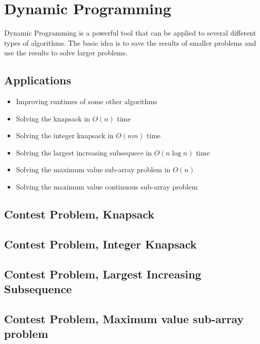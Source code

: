 \section{Dynamic Programming}
Dynamic Programming is a powerful tool that can be applied to several different types of algorithms.
The basic idea is to save the results of smaller problems and use the results to solve larger problems.

\subsection{Applications}
\begin{itemize}
	\item	Improving runtimes of some other algorithms
	\item	Solving the knapsack in $O(n)$ time
	\item	Solving the integer knapsack in $O(nm)$ time
	\item	Solving the largest increasing subsequece in $O(n \log n)$ time
	\item	Solving the maximum value sub-array problem in $O(n)$
	\item	Solving the maximum value continuous sub-array problem
\end{itemize}

\subsection{Contest Problem, Knapsack}
\subsection{Contest Problem, Integer Knapsack}
\subsection{Contest Problem, Largest Increasing Subsequence}
\subsection{Contest Problem, Maximum value sub-array problem}
